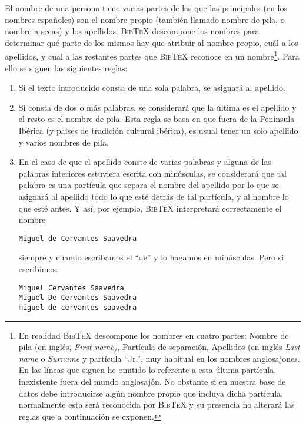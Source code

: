 \documentclass[a4paper,11pt]{article}
\def\btx-{\textsc{Bib\TeX}}
\begin{document}
\begin{description}
  El nombre de una persona tiene  varias partes de las que las principales (en
  los nombres españoles) son el nombre propio (también llamado nombre de pila,
  o  nombre a  secas)  y los  apellidos.   \btx- descompone  los nombres  para
  determinar qué parte de los mismos hay que atribuir al nombre propio, cuál a
  los  apellidos, y  cual a  las  restantes partes  que \btx-  reconoce en  un
  nombre\footnote{En realidad  \btx- descompone los nombres  en cuatro partes:
    Nombre de  pila (en inglés,  \emph{First name)}, Partícula  de separación,
    Apellidos  (en  inglés  \emph{Last  name}  o  \emph{Surname}  y  partícula
    ``Jr.'',  muy habitual  en los  nombres anglosajones.   En las  líneas que
    siguen he omitido lo referente  a esta última partícula, inexistente fuera
    del  mundo anglosajón.   No  obstante si  en  nuestra base  de datos  debe
    introducirse algún nombre propio  que incluya dicha partícula, normalmente
    esta será reconocida por \btx- y su presencia no alterará las reglas que a
    continuación se exponen.}. Para ello se siguen las siguientes reglas:

  \begin{enumerate}[1ª.]

  \item Si  el texto introducido  consta de una  sola palabra, se  asignará al
    apellido.

  \item \label{Regla:2} Si consta de dos o más palabras, se considerará que la
    última es el apellido y el resto es el nombre de pila.  Esta regla se basa
    en  que fuera  de la  Península Ibérica  (y paises  de  tradición cultural
    ibérica), es usual tener un solo apellido y varios nombres de pila.

  \item En el  caso de que el  apellido conste de varias palabras  y alguna de
    las palabras  interiores estuviera escrita con  minúsculas, se considerará
    que tal palabra es una partícula  que separa el nombre del apellido por lo
    que se asignará al apellido todo lo que esté detrás de tal partícula, y al
    nombre  lo  que  esté  antes.   Y así,  por  ejemplo,  \btx-  interpretará
    correctamente el nombre

    {\small\verb|Miguel de Cervantes Saavedra|}

    siempre y cuando escribamos el ``de'' y lo hagamos en minúsculas.  Pero si
    escribimos:

    {\small
\begin{verbatim}
Miguel Cervantes Saavedra
Miguel De Cervantes Saavedra
miguel de cervantes saavedra
\end{verbatim}
    }


\end{enumerate}
\end{description}
\end{document}
